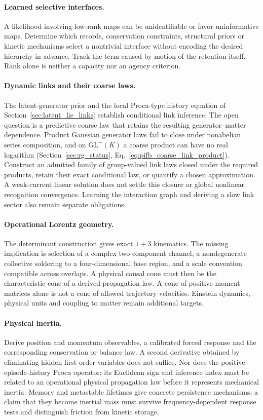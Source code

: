\paragraph{Learned selective interfaces.}
A likelihood involving low-rank maps can be unidentifiable or favor uninformative maps. Determine which records, conservation constraints, structural priors or kinetic mechanisms select a nontrivial interface without encoding the desired hierarchy in advance. Track the term caused by motion of the retention itself. Rank alone is neither a capacity nor an agency criterion.

\paragraph{Dynamic links and their coarse laws.}
The latent-generator prior and the local Proca-type history equation of Section~\ref{sec:latent_lie_links} establish conditional link inference. The open question is a predictive coarse law that retains the resulting generator--matter dependence. Product Gaussian generator laws fail to close under nonabelian series composition, and on $\mathrm{GL}^+(K)$ a coarse product can have no real logarithm (Section~\ref{sec:rg_status}, Eq.~\eqref{eq:pifb_coarse_link_product}). Construct an admitted family of group-valued link laws closed under the required products, retain their exact conditional law, or quantify a chosen approximation. A weak-current linear solution does not settle this closure or global nonlinear recognition convergence. Learning the interaction graph and deriving a slow link sector also remain separate obligations.

\paragraph{Operational Lorentz geometry.}
The determinant construction gives exact $1+3$ kinematics. The missing implication is selection of a complex two-component channel, a nondegenerate collective soldering to a four-dimensional base region, and a scale convention compatible across overlaps. A physical causal cone must then be the characteristic cone of a derived propagation law. A cone of positive moment matrices alone is not a cone of allowed trajectory velocities. Einstein dynamics, physical units and coupling to matter remain additional targets.

\paragraph{Physical inertia.}
Derive position and momentum observables, a calibrated forced response and the corresponding conservation or balance law. A second derivative obtained by eliminating hidden first-order variables does not suffice. Nor does the positive episode-history Proca operator: its Euclidean sign and inference index must be related to an operational physical propagation law before it represents mechanical inertia. Memory and metastable lifetimes give concrete persistence mechanisms; a claim that they become inertial mass must survive frequency-dependent response tests and distinguish friction from kinetic storage.

